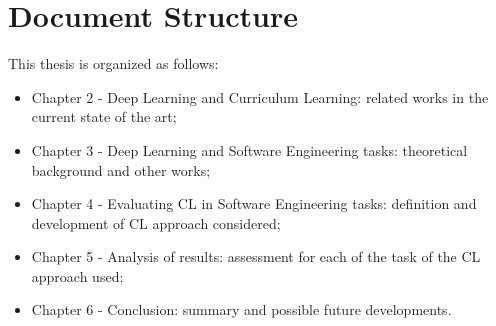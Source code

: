 \section{Document Structure}
This thesis is organized as follows:
\begin{itemize}
    \item Chapter 2 - Deep Learning and Curriculum Learning: related works in the current state of the art;
    \item Chapter 3 - Deep Learning and Software Engineering tasks: theoretical background and other works;
    \item Chapter 4 - Evaluating CL in Software Engineering tasks: definition and development of CL approach considered;
    \item Chapter 5 - Analysis of results: assessment for each of the task of the CL approach used;
    \item Chapter 6 - Conclusion: summary and possible future developments.
\end{itemize}